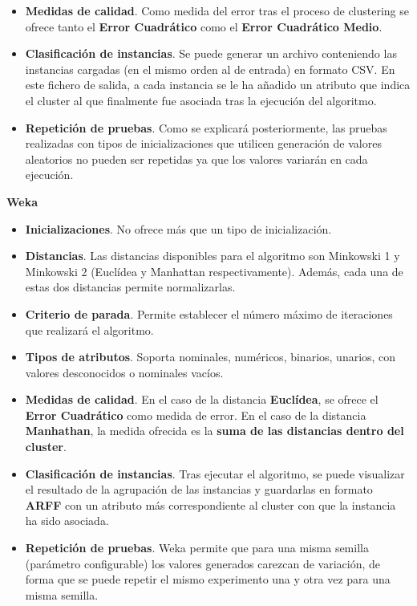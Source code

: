 \documentclass[a4paper]{report}
\begin{document}
\begin{itemize}
		\item	\textbf{Medidas de calidad}. Como medida del error tras el proceso de clustering se ofrece tanto el \textbf{Error Cuadrático} como el \textbf{Error Cuadrático Medio}.
		
		\item	\textbf{Clasificación de instancias}. Se puede generar un archivo conteniendo las instancias cargadas (en el mismo orden al de entrada) en formato CSV. En este fichero de salida, a cada instancia se le ha añadido un atributo que indica el cluster al que finalmente fue asociada tras la ejecución del algoritmo.
		
		\item	\textbf{Repetición de pruebas}. Como se explicará posteriormente, las pruebas realizadas con tipos de inicializaciones que utilicen generación de valores aleatorios no pueden ser repetidas ya que los valores variarán en cada ejecución.
	\end{itemize}
	
	\begin{center}
		\textbf{Weka}
	\end{center}
	
	\begin{itemize}
		\item	\textbf{Inicializaciones}. No ofrece más que un tipo de inicialización.
		
		\item	\textbf{Distancias}. Las distancias disponibles para el algoritmo son Minkowski 1 y Minkowski 2 (Euclídea y Manhattan respectivamente). Además, cada una de estas dos distancias permite normalizarlas.
		
		\item	\textbf{Criterio de parada}. Permite establecer el número máximo de iteraciones que realizará el algoritmo.
		\item	\textbf{Tipos de atributos}. Soporta nominales, numéricos, binarios, unarios, con valores desconocidos o nominales vacíos.
		\item	\textbf{Medidas de calidad}. En el caso de la distancia \textbf{Euclídea}, se ofrece el \textbf{Error Cuadrático} como medida de error. En el caso de la distancia \textbf{Manhathan}, la medida ofrecida es la \textbf{suma de las distancias dentro del cluster}.
		\item	\textbf{Clasificación de instancias}. Tras ejecutar el algoritmo, se puede visualizar el resultado de la agrupación de las instancias y guardarlas en formato \textbf{ARFF} con un atributo más correspondiente al cluster con que la instancia ha sido asociada.
		
		\item	\textbf{Repetición de pruebas}. Weka permite que para una misma semilla (parámetro configurable) los valores generados carezcan de variación, de forma que se puede repetir el mismo experimento una y otra vez para una misma semilla.
	\end{itemize}
	
\end{document}
